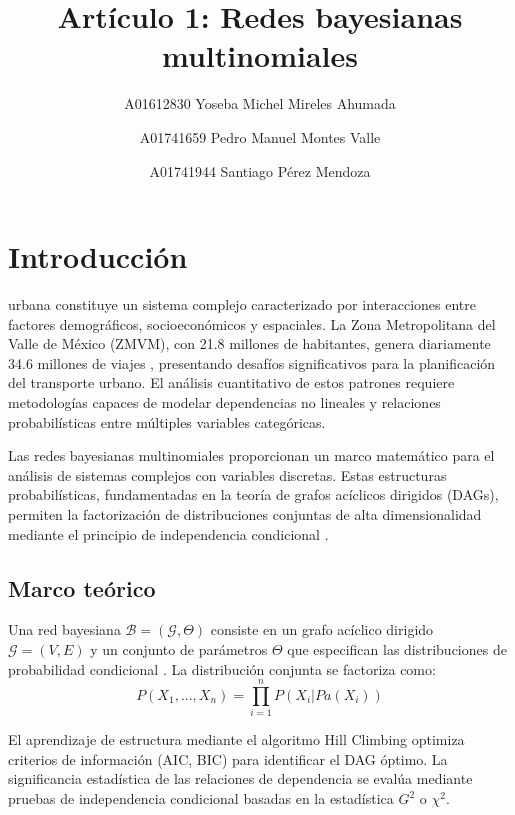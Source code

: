 \documentclass{ajceam-class}   %
\title{Artículo 1: Redes bayesianas multinomiales}
\author[1]{A01612830 Yoseba Michel Mireles Ahumada}
\author[2]{A01741659 Pedro Manuel Montes Valle}
\author[3]{A01741944 Santiago Pérez Mendoza}
\affil[1]{Tecnológico de Monterrey, Campus Guadalajara}
\begin{document}
\maketitle
\thispagestyle{fancy}

\section{Introducción}
 urbana constituye un sistema complejo caracterizado por interacciones entre factores demográficos, socioeconómicos y espaciales. La Zona Metropolitana del Valle de México (ZMVM), con 21.8 millones de habitantes, genera diariamente 34.6 millones de viajes \cite{INEGI2020}, presentando desafíos significativos para la planificación del transporte urbano. El análisis cuantitativo de estos patrones requiere metodologías capaces de modelar dependencias no lineales y relaciones probabilísticas entre múltiples variables categóricas.

Las redes bayesianas multinomiales proporcionan un marco matemático para el análisis de sistemas complejos con variables discretas. Estas estructuras probabilísticas, fundamentadas en la teoría de grafos acíclicos dirigidos (DAGs), permiten la factorización de distribuciones conjuntas de alta dimensionalidad mediante el principio de independencia condicional \cite{Pearl2009,KollerFriedman2009}.

\subsection{Marco teórico}
Una red bayesiana $\mathcal{B} = (\mathcal{G}, \Theta)$ consiste en un grafo acíclico dirigido $\mathcal{G} = (V, E)$ y un conjunto de parámetros $\Theta$ que especifican las distribuciones de probabilidad condicional \cite{ScutariDenis2021}. La distribución conjunta se factoriza como:
\begin{equation}
P(X_1, ..., X_n) = \prod_{i=1}^{n} P(X_i | Pa(X_i))
\label{eq:bayes_factor}
\end{equation}

El aprendizaje de estructura mediante el algoritmo Hill Climbing optimiza criterios de información (AIC, BIC) para identificar el DAG óptimo. La significancia estadística de las relaciones de dependencia se evalúa mediante pruebas de independencia condicional basadas en la estadística $G^2$ o $\chi^2$. \cite{ScutariDenis2021}
\end{document}
